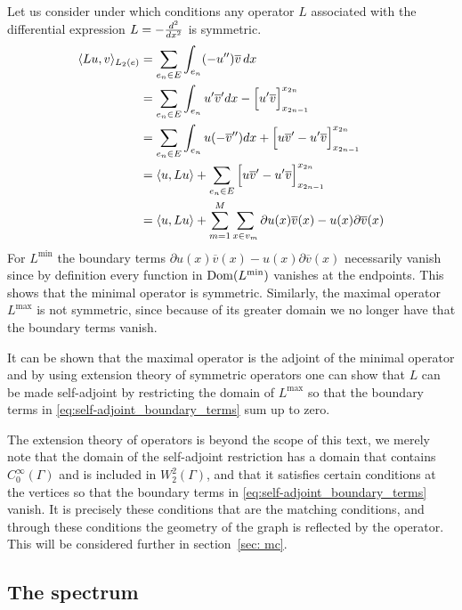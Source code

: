 Let us consider under which conditions any operator $L$ associated with the differential expression $L=-\frac{d^2}{dx^2}$ is symmetric.
\begin{equation}\label{eq:self-adjoint_boundary_terms}
  \begin{aligned}
    \langle Lu, v \rangle_{L_2(e)}
    &= \sum_{e_n \in E} \int_{e_n} (-u'')\overline{v}\,dx \\
    &= \sum_{e_n \in E} \int_{e_n} u'\overline{v}' dx - \Big[u'\overline{v}\Big]_{x_{2n-1}}^{x_{2n}} \\
    &= \sum_{e_n \in E} \int_{e_n} u(-\overline{v}'') dx + \Big[u\overline{v}' - u'\overline{v}\Big]_{x_{2n-1}}^{x_{2n}} \\
    &= \langle u, Lu \rangle + \sum_{e_n \in E} \Big[u\overline{v}' - u'\overline{v}\Big]_{x_{2n-1}}^{x_{2n}} \\
    &= \langle u, Lu \rangle + \sum_{m=1}^{M} \sum_{x \in v_m} \partial u(x)\overline{v}(x) - u(x)\partial\overline{v}(x)
  \end{aligned}
\end{equation}
For $L^\text{min}$ the boundary terms $\partial u(x)\overline{v}(x) - u(x)\partial\overline{v}(x)$ necessarily vanish since by definition every function in $\operatorname{Dom}(L^\text{min})$ vanishes at the endpoints. This shows that the minimal operator is symmetric. Similarly, the maximal operator $L^\text{max}$ is not symmetric, since because of its greater domain we no longer have that the boundary terms vanish.

It can be shown that the maximal operator is the adjoint of the minimal operator and by using extension theory of symmetric operators one can show that $L$ can be made self-adjoint by restricting the domain of $L^\text{max}$ so that the boundary terms in \ref{eq:self-adjoint_boundary_terms} sum up to zero.

The extension theory of operators is beyond the scope of this text, we merely note that the domain of the self-adjoint restriction has a domain that contains $C^\infty_0(\Gamma)$ and is included in $W^2_2(\Gamma)$, and that it satisfies certain conditions at the vertices so that the boundary terms in \ref{eq:self-adjoint_boundary_terms} vanish. It is precisely these conditions that are the matching conditions, and through these conditions the geometry of the graph is reflected by the operator. This will be considered further in section~\ref{sec: mc}.



\subsection{The spectrum}\label{sec: spectrum}

